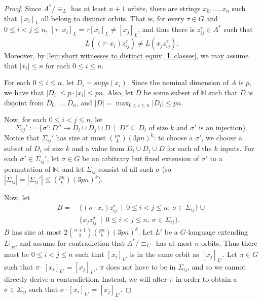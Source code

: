 \documentclass[11pt,a4paper]{amsart}
\theoremstyle{definition}
\newcommand{\bb}{\mathbb}
\begin{document}
\begin{proof}
    Since $A^* / \equiv_L$ has at least $n+1$ orbits, there are strings $x_0, \ldots, x_n$ such that $[x_i]_{L}$ all belong to distinct orbits. 
    That is, for every $\tau \in G$ and $0 \leq i < j \leq n$, $[\tau \cdot x_i]_L = \tau [x_i]_L \neq [x_j]_L$, and thus there is $z^\tau_{ij} \in A^*$ such that 
    \[
        L((\tau \cdot x_i) z^\tau_{ij}) \neq L(x_j z^\tau_{ij}).
    \]
    Moreover, by \autoref{lem:short witnesses to distinct equiv_L classes}, we may assume that $|x_i| \leq n$ for each $0 \leq i \leq n$. 

    For each $0 \leq i \leq n$, let $D_i = supp(x_i)$. 
    Since the nominal dimension of $A$ is $p$, we have that $|D_i| \leq p \cdot |x_i| \leq pn$. 
    Also, let $D$ be some subset of $\bb N$ such that $D$ is disjoint from $D_0, \ldots, D_n$, and $\displaystyle |D| = \max_{0 \leq i \leq n} |D_i| \leq pn$.

    Now, for each $0 \leq i < j \leq n$, let
    \[
        \Sigma_{ij}' := \{\sigma' : D'' \to D_i \cup D_j \cup D \ \mid \ D'' \subseteq D_i \text{ of size } k \text{ and $\sigma'$ is an injection}\}.
    \]
    Notice that $\Sigma_{ij}'$ has size at most $\binom{pn}{k} (3pn)^k$: to choose a $\sigma'$, we choose a subset of $D_i$ of size $k$ and a value from $D_i \cup D_j \cup D$ for each of the $k$ inputs.
    For each $\sigma' \in \Sigma_{ij}'$, let $\sigma \in G$ be an arbitrary but fixed extension of $\sigma'$ to a permutation of $\bb N$, and let $\Sigma_{ij}$ consist of all such $\sigma$ (so $|\Sigma_{ij}| = |\Sigma_{ij}'| \leq \binom{pn}{k} (3pn)^k$). 

    Now, let 
    \begin{align*}
        B = \ &\{(\sigma \cdot x_i) z^\sigma_{ij} \ \mid \ 0 \leq i < j \leq n, \ \sigma \in \Sigma_{ij}\} \cup \\
        &\{x_j z^\sigma_{ij} \ \mid \ 0 \leq i < j \leq n, \ \sigma \in \Sigma_{ij}\}.
    \end{align*}
    $B$ has size at most $2 \binom{n+1}{2} \binom{pn}{k} (3pn)^k$. 
    Let $L'$ be a $G$-language extending $L|_B$, and assume for contradiction that $A^* / \equiv_{L'}$ has at most $n$ orbits. 
    Thus there must be $0 \leq i < j \leq n$ such that $[x_i]_{L'}$ is in the same orbit as $[x_j]_{L'}$. 
    Let $\pi \in G$ such that $\pi \cdot [x_i]_{L'} = [x_j]_{L'}$. 
    $\pi$ does not have to be in $\Sigma_{ij}$, and so we cannot directly derive a contradiction. 
    Instead, we will alter $\pi$ in order to obtain a $\sigma \in \Sigma_{ij}$ such that $\sigma \cdot [x_i]_{L'} = [x_j]_{L'}$.


\end{proof}
\end{document}
